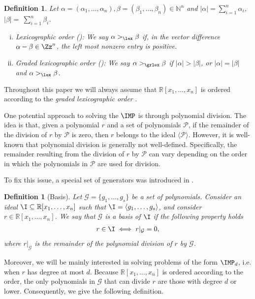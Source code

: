 \documentclass[11pt]{article}
\newtheorem{definition}[theorem]{Definition}
\begin{document}
\begin{definition}\label{def:lex and grlex} Let $\alpha =(\alpha_1,\ldots,\alpha_n),\beta=(\beta_1,\ldots,\beta_n)\in \mathbb{N}^n$ and $|\alpha| = \sum_{i=1}^n\alpha_i$, $|\beta| = ~\sum_{i=1}^n\beta_i$.
  \begin{enumerate}[(i)]
      \item Lexicographic order (\lexns): We say $\alpha>_\lex \beta$ if, in the vector difference $\alpha -\beta \in \Zz^n$, the left most nonzero entry is positive. 
      \item Graded lexicographic order (\grlexns): We say $\alpha>_\grlex \beta$ if $|\alpha| >|\beta|$, or $|\alpha| =|\beta|$ and $\alpha>_\lex \beta$.
  \end{enumerate}
\end{definition}

Throughout this paper we will always assume that $\mathbb{R}[x_1,\ldots,x_n]$ is ordered according to the \textit{graded lexicographic order} \grlexns.

One potential approach to solving the $\IMP$ is through polynomial division. The idea is that, given a polynomial $r$ and a set of polynomials $\mathcal{P}$, if the remainder of the division of $r$ by $\mathcal{P}$ is zero, then $r$ belongs to the ideal $\langle \mathcal{P} \rangle$. However, it is well-known that polynomial division is generally not well-defined. Specifically, the remainder resulting from the division of $r$ by $\mathcal{P}$ can vary depending on the order in which the polynomials in $\mathcal{P}$ are used for division.

To fix this issue, a special set of generators was introduced in \cite{BuchbergerThesis}.
\begin{definition}[\GB Basis]
    Let $\mathcal{G} = \{g_1, \ldots, g_s\}$ be a set of polynomials. Consider an ideal $\I \subseteq \mathbb{R}[x_1, \ldots, x_n]$ such that $\I = \langle g_1, \ldots, g_s \rangle$, and consider $r \in \mathbb{R}[x_1, \ldots, x_n]$. We say that $\mathcal{G}$ is a \emph{\GB basis of $\I$} if the following property holds
    \begin{align*}
        r \in \I \iff r|_{\mathcal{G}} = 0,
    \end{align*}
where $r|_{\mathcal{G}}$ is the remainder of the polynomial division of $r$ by $\mathcal{G}$.
\end{definition}
%
Moreover, we will be mainly interested in solving problems of the form $\IMP_d$, i.e. when $r$ has degree at most $d$. Because $\mathbb{R}[x_1,\ldots,x_n]$ is ordered according to the \grlex order, the only polynomials in $\mathcal{G}$ that can divide $r$ are those with degree $d$ or lower. Consequently, we give the following definition.
\end{document}
